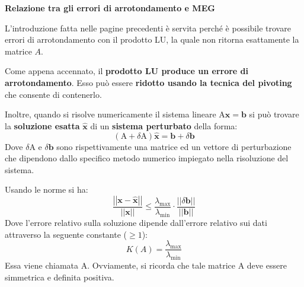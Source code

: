 \newpage

\begin{flushleft}
    \textcolor{Green3}{ \textbf{Relazione tra gli errori di arrotondamento e MEG}}
\end{flushleft}
L'introduzione fatta nelle pagine precedenti è servita perché è possibile trovare errori di arrotondamento con il prodotto LU, la quale non ritorna esattamente la matrice $A$.

\highspace
Come appena accennato, il \textbf{prodotto LU produce un errore di arrotondamento}. Esso può essere \textbf{ridotto usando la tecnica del pivoting} che consente di contenerlo.

\highspace
Inoltre, quando si risolve numericamente il sistema lineare $\mathrm{A}\mathbf{x} = \mathbf{b}$ si può trovare la \textbf{soluzione esatta} $\widehat{\mathbf{x}}$ di un \textbf{sistema perturbato} della forma:
\begin{equation}
    \left(\mathrm{A} + \delta \mathrm{A}\right) \widehat{\mathbf{x}} = \mathbf{b} + \delta \mathbf{b}
\end{equation}
Dove $\delta \mathrm{A}$ e $\delta \mathbf{b}$ sono rispettivamente una matrice ed un vettore di perturbazione che dipendono dallo specifico metodo numerico impiegato nella risoluzione del sistema.

\highspace
Usando le norme si ha:
\begin{equation}\label{eq: errore di arrotondamento MEG - norma}
    \dfrac{
        \left|\left| \mathbf{x} - \widehat{\mathbf{x}} \right|\right|
    }{
        \left|\left| \mathbf{x} \right|\right|
    }
    \le
    \dfrac{\lambda_{\text{max}}}{\lambda_{\text{min}}}
    \cdot
    \dfrac{
        \left|\left| \delta \mathbf{b} \right|\right|
    }{
        \left|\left| \mathbf{b} \right|\right|
    }
\end{equation}
Dove l'errore relativo sulla soluzione dipende dall'errore relativo sui dati attraverso la seguente constante ($\ge 1$):
\begin{equation}\label{eq: numero di condizionamento (spettrale)}
    K\left(A\right) = \dfrac{\lambda_{\text{max}}}{\lambda_{\text{min}}}
\end{equation}
Essa viene chiamata  A. Ovviamente, si ricorda che tale matrice A deve essere simmetrica e definita positiva.

